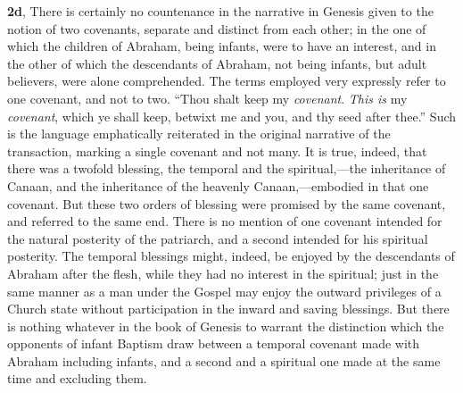\documentclass[
  english,
]{book}
\begin{document}
\textbf{2d}, There is certainly no countenance in the narrative in Genesis given to the notion of two covenants, separate and distinct from each other; in the one of which the children of Abraham, being infants, were to have an interest, and in the other of which the descendants of Abraham, not being infants, but adult believers, were alone comprehended. The terms employed very expressly refer to one covenant, and not to two. ``Thou shalt keep my \emph{covenant}. \emph{This is} my \emph{covenant}, which ye shall keep, betwixt me and you, and thy seed after thee.'' Such is the language emphatically reiterated in the original narrative of the transaction, marking a single covenant and not many. It is true, indeed, that there was a twofold blessing, the temporal and the spiritual,---the inheritance of Canaan, and the inheritance of the heavenly Canaan,---embodied in that one covenant. But these two orders of blessing were promised by the same covenant, and referred to the same end. There is no mention of one covenant intended for the natural posterity of the patriarch, and a second intended for his spiritual posterity. The temporal blessings might, indeed, be enjoyed by the descendants of Abraham after the flesh, while they had no interest in the spiritual; just in the same manner as a man under the Gospel may enjoy the outward privileges of a Church state without participation in the inward and saving blessings. But there is nothing whatever in the book of Genesis to warrant the distinction which the opponents of infant Baptism draw between a temporal covenant made with Abraham including infants, and a second and a spiritual one made at the same time and excluding them.
\end{document}
